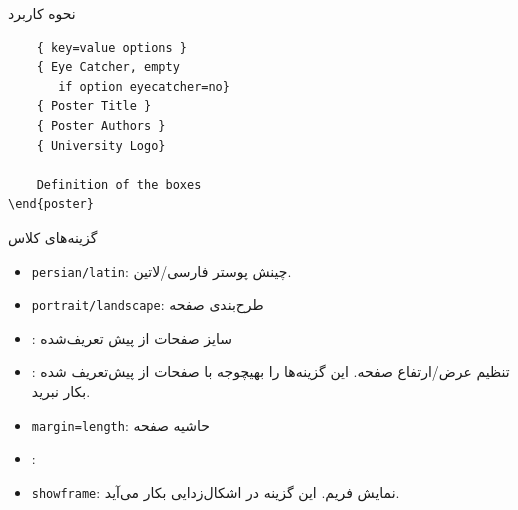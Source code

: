 \documentclass[debug,a0paper,persian]{xebaposter}
\begin{document}
\begin{poster}
\begin{posterbox}[name=usage,column=1,span=1,headershape=rounded,textborder=rectangle
,textborder=faded]{نحوه کاربرد}
\begin{latin}
\begin{verbatim}
    { key=value options }
    { Eye Catcher, empty 
       if option eyecatcher=no}
    { Poster Title }
    { Poster Authors }
    { University Logo}
    
    Definition of the boxes
\end{poster}
\end{verbatim}
\end{latin}
\end{posterbox}
\begin{posterbox}[name=classoption,column=2,span=1,headershape=rectangle,textborder=roundedsmall]
{گزینه‌های کلاس}
\begin{itemize}
    \item \texttt{persian/latin}:
     چینش پوستر فارسی/لاتین.%
    \item \texttt{portrait/landscape}: طرح‌بندی صفحه
    \item {}: سایز صفحات از پیش تعریف‌شده
    \item {}: تنظیم عرض/ارتفاع صفحه. 
    این گزینه‌ها را بهیچوجه با صفحات از پیش‌تعریف شده بکار نبرید.
    \item \texttt{margin=length}: حاشیه صفحه
    \item {}:
    \item \texttt{showframe}: نمایش فریم. این گزینه‌ در اشکال‌زدایی بکار می‌آید.
\end{itemize}
\end{posterbox}


\end{poster}
\end{document}
